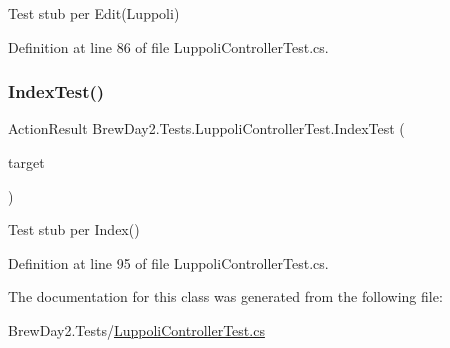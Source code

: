 Test stub per Edit(\+Luppoli)



Definition at line 86 of file Luppoli\+Controller\+Test.\+cs.

\mbox{\label{class_brew_day2_1_1_tests_1_1_luppoli_controller_test_af6be3986abe2631ee0fdce2c4106cfb5}} 
\subsubsection{\texorpdfstring{Index\+Test()}{IndexTest()}}
{\footnotesize\ttfamily Action\+Result Brew\+Day2.\+Tests.\+Luppoli\+Controller\+Test.\+Index\+Test (\begin{DoxyParamCaption}\item[{\mbox{[}\+Pex\+Assume\+Under\+Test\mbox{]} \mbox{\hyperlink{class_brew_day2_1_1_controllers_1_1_luppoli_controller}{Luppoli\+Controller}}}]{target }\end{DoxyParamCaption})}



Test stub per Index()



Definition at line 95 of file Luppoli\+Controller\+Test.\+cs.



The documentation for this class was generated from the following file\+:\begin{DoxyCompactItemize}
\item 
Brew\+Day2.\+Tests/\mbox{\hyperlink{_luppoli_controller_test_8cs}{Luppoli\+Controller\+Test.\+cs}}\end{DoxyCompactItemize}
